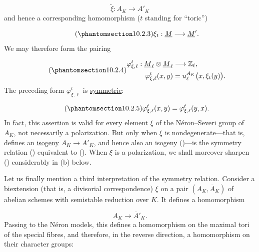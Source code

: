 \begin{equation*}
\widetilde\xi:A_K\longrightarrow A'_K
\end{equation*}
and hence a corresponding homomorphism ($t$ standing for ``toric'')

\begin{equation}\tag{\SGARefTarget{sga7.sga7i.eix.n10-2-3}{10.2.3}}
\xi_t:\underline M\longrightarrow\underline M'.
\end{equation}
We may therefore form the pairing

\begin{equation}\tag{\SGARefTarget{sga7.sga7i.eix.n10-2-4}{10.2.4}}
\begin{aligned}
\varphi^t_{\xi,\ell}:\underline M_\ell\otimes\underline M_\ell
 &\longrightarrow\mathbb Z_\ell,\\
\varphi^t_{\xi,\ell}(x,y)&=u_\ell^{A_K}\bigl(x,\xi_t(y)\bigr).
\end{aligned}
\end{equation}
The preceding form $\varphi^t_{\xi,\ell}$ is \underline{symmetric}:

\begin{equation}\tag{\SGARefTarget{sga7.sga7i.eix.n10-2-5}{10.2.5}}
\varphi^t_{\xi,\ell}(x,y)=\varphi^t_{\xi,\ell}(y,x).
\end{equation}
In fact, this assertion is valid for every element $\xi$ of the
Néron--Severi group of $A_K$, not necessarily a polarization. But only
when $\xi$ is nondegenerate---that is, defines an \underline{isogeny}
$A_K\longrightarrow A'_K$, and hence also an isogeny ()---is the
symmetry relation () equivalent to (). When $\xi$ is a
polarization, we shall moreover sharpen () considerably in (b)
below.

Let us finally mention a third interpretation of the symmetry relation.
Consider a biextension (that is, a divisorial correspondence) $\xi$ on a
pair $(A_K,\overline A_K)$ of abelian schemes with semistable reduction
over $K$. It defines a homomorphism

\begin{equation*}
A_K\longrightarrow\overline A'_K.
\end{equation*}
Passing to the Néron models, this defines a homomorphism on the maximal
tori of the special fibres, and therefore, in the reverse direction, a
homomorphism on their character groups:

